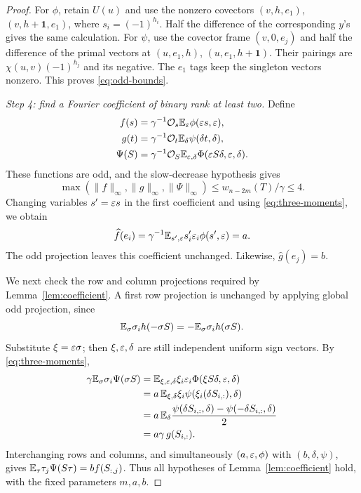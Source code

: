 \begin{proof}
For \(\phi\), retain \(U(u)\) and use the nonzero covectors
\((v,h,e_1)\), \((v,h+\mathbf1,e_1)\), where
\(s_i=(-1)^{h_i}\). Half the difference of the corresponding
\(y\)'s gives the same calculation.
For \(\psi\), use the covector frame \((v,0,e_j)\) and half the
difference of the primal vectors at
\((u,e_1,h)\), \((u,e_1,h+\mathbf1)\).
Their pairings are \(\chi(u,v)(-1)^{h_j}\) and its negative.
The \(e_1\) tags keep the singleton vectors nonzero.
This proves \eqref{eq:odd-bounds}.

\medskip
\textit{Step 4: find a Fourier coefficient of binary rank at least two.}
Define
\begin{equation}\label{eq:normalized-functions}
\begin{split}
f(s)&=\gamma^{-1}\mathcal O_s\mathbb E_\varepsilon\phi(\varepsilon s,\varepsilon),\\
g(t)&=\gamma^{-1}\mathcal O_t\mathbb E_\delta\psi(\delta t,\delta),\\
\Psi(S)&=\gamma^{-1}\mathcal O_S\mathbb E_{\varepsilon,\delta}
                  \Phi(\varepsilon S\delta,\varepsilon,\delta).
\end{split}
\end{equation}
These functions are odd, and the slow-decrease hypothesis gives
\[
\max(\|f\|_\infty,\|g\|_\infty,\|\Psi\|_\infty)
\le w_{n-2m}(T)/\gamma\le4.
\]
Changing variables \(s'=\varepsilon s\) in the first coefficient and using
\eqref{eq:three-moments}, we obtain
\[
\widehat f(e_i)
=\gamma^{-1}\mathbb E_{s',\varepsilon}s'_i\varepsilon_i\phi(s',\varepsilon)=a.
\]
The odd projection leaves this coefficient unchanged.
Likewise, \(\widehat g(e_j)=b\).

We next check the row and column projections required by
Lemma~\ref{lem:coefficient}. A first row projection is unchanged by
applying global odd projection, since
\[
\mathbb E_\sigma\sigma_i h(-\sigma S)
=-\mathbb E_\sigma\sigma_i h(\sigma S).
\]
Substitute \(\xi=\varepsilon\sigma\); then \(\xi,\varepsilon,\delta\) are still
independent uniform sign vectors. By \eqref{eq:three-moments},
\begin{align*}
\gamma\mathbb E_\sigma\sigma_i\Psi(\sigma S)
&=\mathbb E_{\xi,\varepsilon,\delta}\xi_i\varepsilon_i
                   \Phi(\xi S\delta,\varepsilon,\delta)\\
&=a\,\mathbb E_{\xi,\delta}\xi_i
                  \psi(\xi_i(\delta S_{i,:}),\delta)\\
&=a\,\mathbb E_\delta\frac{\psi(\delta S_{i,:},\delta)
                         -\psi(-\delta S_{i,:},\delta)}2\\
&=a\gamma\,g(S_{i,:}).
\end{align*}
Interchanging rows and columns, and simultaneously
\((a,\varepsilon,\phi)\) with \((b,\delta,\psi)\), gives
\(\mathbb E_\tau\tau_j\Psi(S\tau)=b f(S_{:,j})\).
Thus all hypotheses of Lemma~\ref{lem:coefficient} hold, with the fixed
parameters \(m,a,b\).


\end{proof}
